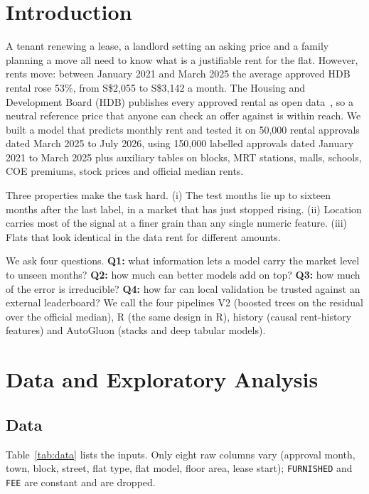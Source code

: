 \documentclass[conference]{IEEEtran}
\newif\ifshowsrc
\newcommand{\src}[1]{\ifshowsrc\textsuperscript{\tiny\color{gray}[#1]}\fi}
\newcommand{\sgd}{S\$}
\begin{document}
\section{Introduction}
A tenant renewing a lease, a landlord setting an asking price and a family planning a move all need to know what is a justifiable rent for the flat. However, rents move: between January 2021 and March 2025 the average approved HDB rental rose 53\%, from \sgd 2,055 to \sgd 3,142 a month.\src{Be-trend} The Housing and Development Board (HDB) publishes every approved rental as open data~\cite{hdbrent}, so a neutral reference price that anyone can check an offer against is within reach. We built a model that predicts monthly rent and tested it on 50,000 rental approvals dated March 2025 to July 2026, using 150,000 labelled approvals dated January 2021 to March 2025 plus auxiliary tables on blocks, MRT stations, malls, schools, COE premiums, stock prices and official median rents.\src{Pu-task,Be-inputs}

Three properties make the task hard. (i) The test months lie up to sixteen months after the last label, in a market that has just stopped rising.\src{Pu-future} (ii) Location carries most of the signal at a finer grain than any single numeric feature.\src{Be-weakcorr} (iii) Flats that look identical in the data rent for different amounts.\src{Pu-noise}

We ask four questions. \textbf{Q1:} what information lets a model carry the market level to unseen months? \textbf{Q2:} how much can better models add on top? \textbf{Q3:} how much of the error is irreducible? \textbf{Q4:} how far can local validation be trusted against an external leaderboard? We call the four pipelines V2 (boosted trees on the residual over the official median), R (the same design in R), history (causal rent-history features) and AutoGluon (stacks and deep tabular models).

\section{Data and Exploratory Analysis}
\subsection{Data}
Table~\ref{tab:data} lists the inputs. Only eight raw columns vary (approval month, town, block, street, flat type, flat model, floor area, lease start); \texttt{FURNISHED} and \texttt{FEE} are constant and are dropped.\src{Pu-task}
\end{document}
